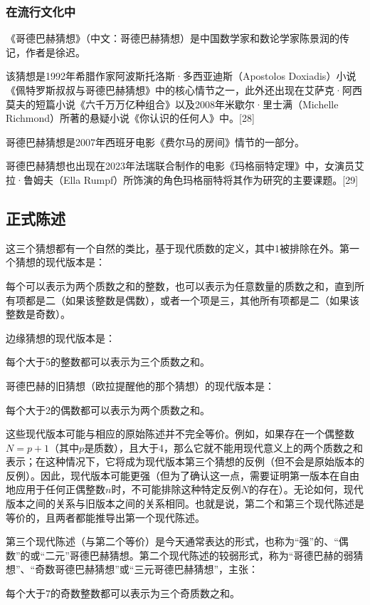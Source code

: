 \subsubsection{在流行文化中}
《哥德巴赫猜想》（中文：哥德巴赫猜想）是中国数学家和数论学家陈景润的传记，作者是徐迟。

该猜想是1992年希腊作家阿波斯托洛斯·多西亚迪斯（Apostolos Doxiadis）小说《佩特罗斯叔叔与哥德巴赫猜想》中的核心情节之一，此外还出现在艾萨克·阿西莫夫的短篇小说《六千万万亿种组合》以及2008年米歇尔·里士满（Michelle Richmond）所著的悬疑小说《你认识的任何人》中。[28]

哥德巴赫猜想是2007年西班牙电影《费尔马的房间》情节的一部分。

哥德巴赫猜想也出现在2023年法瑞联合制作的电影《玛格丽特定理》中，女演员艾拉·鲁姆夫（Ella Rumpf）所饰演的角色玛格丽特将其作为研究的主要课题。[29]
\subsection{正式陈述}
这三个猜想都有一个自然的类比，基于现代质数的定义，其中1被排除在外。第一个猜想的现代版本是：

每个可以表示为两个质数之和的整数，也可以表示为任意数量的质数之和，直到所有项都是二（如果该整数是偶数），或者一个项是三，其他所有项都是二（如果该整数是奇数）。

边缘猜想的现代版本是：

每个大于5的整数都可以表示为三个质数之和。

哥德巴赫的旧猜想（欧拉提醒他的那个猜想）的现代版本是：

每个大于2的偶数都可以表示为两个质数之和。

这些现代版本可能与相应的原始陈述并不完全等价。例如，如果存在一个偶整数\(N=p +1\)（其中\(p\)是质数），且大于4，那么它就不能用现代意义上的两个质数之和表示；在这种情况下，它将成为现代版本第三个猜想的反例（但不会是原始版本的反例）。因此，现代版本可能更强（但为了确认这一点，需要证明第一版本在自由地应用于任何正偶整数\(n\)时，不可能排除这种特定反例\(N\)的存在）。无论如何，现代版本之间的关系与旧版本之间的关系相同。也就是说，第二个和第三个现代陈述是等价的，且两者都能推导出第一个现代陈述。

第三个现代陈述（与第二个等价）是今天通常表达的形式，也称为“强”的、“偶数”的或“二元”哥德巴赫猜想。第二个现代陈述的较弱形式，称为“哥德巴赫的弱猜想”、“奇数哥德巴赫猜想”或“三元哥德巴赫猜想”，主张：

每个大于7的奇数整数都可以表示为三个奇质数之和。
